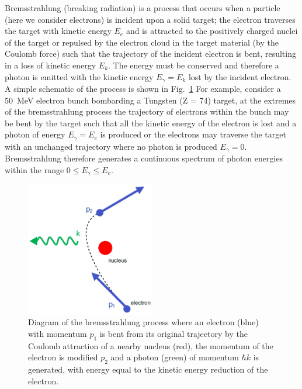 \documentclass[../main.tex]{subfiles}
\begin{document}
Bremsstrahlung (breaking radiation) is a process that occurs when a particle (here we consider electrons) is incident upon a solid target; the electron traverses the target with kinetic energy $E_{e}$ and is attracted to the positively charged nuclei of the target or repulsed by the electron cloud in the target material (by the Coulomb force) such that the trajectory of the incident electron is bent, resulting in a loss of kinetic energy $E_{k}$. The energy must be conserved and therefore a photon is emitted with the kinetic energy $E_{\gamma}=E_{k}$ lost by the incident electron. A simple schematic of the process is shown in Fig.~\ref{fig:bremsstrahlung_diagram} For example, consider a 50~\si{\mega\electronvolt} electron bunch bombarding a Tungsten (Z = 74) target, at the extremes of the bremsstrahlung process the trajectory of electrons within the bunch may be bent by the target such that all the kinetic energy of the electron is lost and a photon of energy $E_{\gamma}=E_{e}$ is produced or the electrons may traverse the target with an unchanged trajectory where no photon is produced $E_{\gamma}=0$. Bremsstrahlung therefore generates a continuous spectrum of photon energies within the range $0 \leq E_{\gamma} \leq E_{e}$.
\begin{figure}[!h]
\centering
\includegraphics[width=0.5\textwidth]{Figures/DIANA_Inverse_Compton_Source_Design/Bremsstrahlung_fixed.pdf}
\caption{Diagram of the bremsstrahlung process where an electron (blue) with momentum $p_{1}$ is bent from its original trajectory by the Coulomb attraction of a nearby nucleus (red), the momentum of the electron is modified $p_{2}$ and a photon (green) of momentum $\hbar k$ is generated, with energy equal to the kinetic energy reduction of the electron.}
\label{fig:bremsstrahlung_diagram}
\end{figure}
\end{document}
